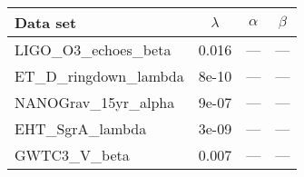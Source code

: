 \begin{tabular}{lccc}\toprule
Data set & $\lambda$ & $\alpha$ & $\beta$\\ \midrule
LIGO\_O3\_echoes\_beta & 0.016 & --- & ---\\
ET\_D\_ringdown\_lambda & 8e-10 & --- & ---\\
NANOGrav\_15yr\_alpha & 9e-07 & --- & ---\\
EHT\_SgrA\_lambda & 3e-09 & --- & ---\\
GWTC3\_V\_beta & 0.007 & --- & ---\\
\bottomrule\end{tabular}